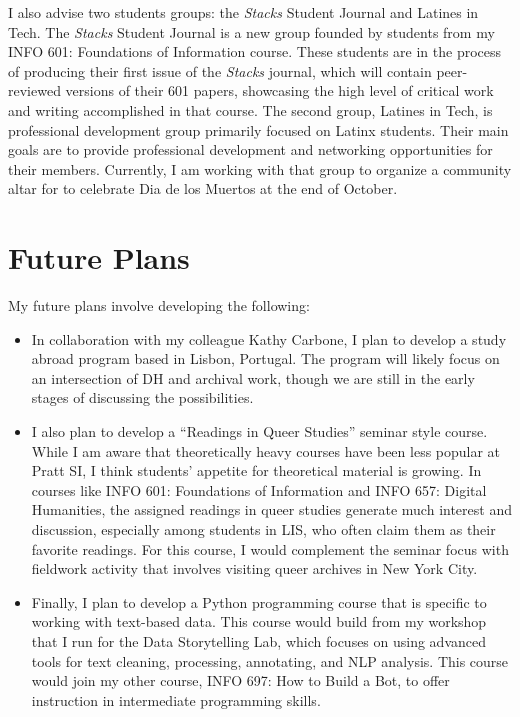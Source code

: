 \documentclass[12pt]{article}
\begin{document}
I also advise two students groups: the \emph{Stacks} Student Journal and
Latines in Tech. The \emph{Stacks} Student Journal is a new group founded
by students from my INFO 601: Foundations of Information course. These
students are in the process of producing their first issue of the
\emph{Stacks} journal, which will contain peer-reviewed versions of their
601 papers, showcasing the high level of critical work and writing
accomplished in that course. The second group, Latines in Tech, is
professional development group primarily focused on Latinx students.
Their main goals are to provide professional development and
networking opportunities for their members. Currently, I am working
with that group to organize a community altar for to celebrate Dia de
los Muertos at the end of October.

\section*{Future Plans}
\label{sec:org8e24ec5}
My future plans involve developing the following:
\begin{itemize}
\item In collaboration with my colleague Kathy Carbone, I plan to develop
a study abroad program based in Lisbon, Portugal. The program will
likely focus on an intersection of DH and archival work, though we
are still in the early stages of discussing the possibilities.
\item I also plan to develop a ``Readings in Queer Studies'' seminar style
course. While I am aware that theoretically heavy courses have been
less popular at Pratt SI, I think students' appetite for theoretical
material is growing. In courses like INFO 601: Foundations of
Information and INFO 657: Digital Humanities, the assigned readings
in queer studies generate much interest and discussion, especially
among students in LIS, who often claim them as their favorite
readings. For this course, I would complement the seminar focus with
fieldwork activity that involves visiting queer archives in New York
City.
\item Finally, I plan to develop a Python programming course that is
specific to working with text-based data. This course would build
from my workshop that I run for the Data Storytelling Lab, which
focuses on using advanced tools for text cleaning, processing,
annotating, and NLP analysis. This course would join my other
course, INFO 697: How to Build a Bot, to offer instruction in
intermediate programming skills.
\end{itemize}
\end{document}
